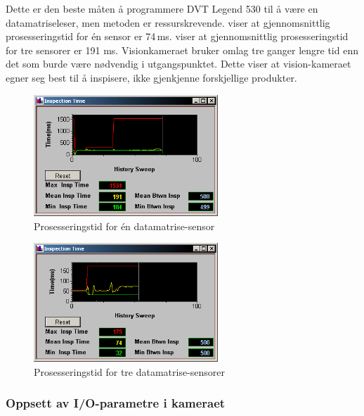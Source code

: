 \documentclass[Visionprosjekt.tex]{subfiles}
\begin{document}
Dette er den beste måten å programmere DVT Legend 530 til å være en datamatriseleser, men metoden er ressurskrevende.  viser at gjennomsnittlig prosesseringstid for én sensor er 74\,ms.  viser at gjennomsnittlig prosesseringstid for tre sensorer er 191 ms. Visionkameraet bruker omlag tre ganger lengre tid enn det som burde være nødvendig i utgangspunktet. Dette viser at vision-kameraet egner seg best til å inspisere, ikke gjenkjenne forskjellige produkter.

\begin{figure}[ht]
	\centering
		\includegraphics[width=0.618\textwidth]{bilder/prosesseringstidx3.png}
	\caption{Prosesseringstid for én datamatrise-sensor}
    \label{fig:prosesseringstidx1}
\end{figure}


\begin{figure}[ht]
	\centering
		\includegraphics[width=0.618\textwidth]{bilder/prosesseringstidx1.png}
	\caption{Prosesseringstid for tre datamatrise-sensorer}
    \label{fig:prosesseringstidx3}
\end{figure}












\clearpage
\subsubsection{Oppsett av I/O-parametre i kameraet}
\end{document}
